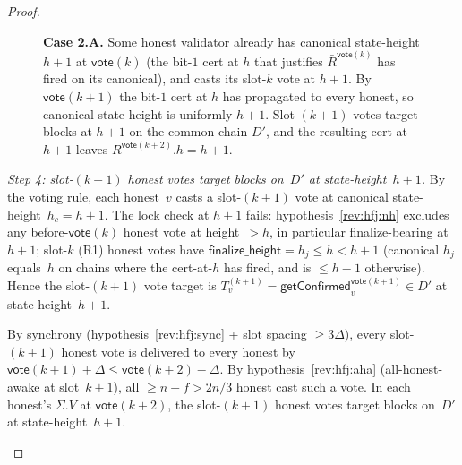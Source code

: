 \ifx\litemode\undefined\documentclass{article}\fi
\newcommand{\finalizeHeight}{\mathsf{finalize\_height}}
\newcommand{\vote}{\mathsf{vote}}
\newcommand{\comm}[1]{\bar{#1}}
\newcommand{\getConfirmed}{\textsf{getConfirmed}\xspace}
\theoremstyle{plain}
\theoremstyle{definition}
\theoremstyle{remark}
\newcommand{\AHA}{all-honest-awake\xspace}
\begin{document}
\begin{proof}
\begin{description}
\begin{description}
\begin{figure}[H]
\caption{\label{rev:fig:hfj-case2a}\textbf{Case 2.A.} Some honest validator already has canonical state-height $h+1$ at $\vote(k)$ (the bit-$1$ cert at $h$ that justifies $\comm{R}^{\vote(k)}$ has fired on its canonical), and casts its slot-$k$ vote at $h+1$. By $\vote(k+1)$ the bit-$1$ cert at $h$ has propagated to every honest, so canonical state-height is uniformly $h+1$. Slot-$(k+1)$ votes target blocks at $h+1$ on the common chain $D'$, and the resulting cert at $h+1$ leaves $R^{\vote(k+2)}.h = h+1$.}
\end{figure}

\emph{Step 4: slot-$(k+1)$ honest votes target blocks on~$D'$ at state-height~$h+1$.}
By the voting rule, each honest~$v$ casts a slot-$(k+1)$ vote at canonical state-height~$h_c = h+1$. The lock check at $h+1$ fails: hypothesis~\ref{rev:hfj:nh} excludes any before-$\vote(k)$ honest vote at height~$>h$, in particular finalize-bearing at $h+1$; slot-$k$ (R1) honest votes have $\finalizeHeight = h_j \leq h < h+1$ (canonical $h_j$ equals~$h$ on chains where the cert-at-$h$ has fired, and is $\leq h-1$ otherwise). Hence the slot-$(k+1)$ vote target is $T_v^{(k+1)} = \getConfirmed_v^{\vote(k+1)} \in D'$ at state-height~$h+1$.

By synchrony (hypothesis~\ref{rev:hfj:sync} + slot spacing $\geq 3\Delta$), every slot-$(k+1)$ honest vote is delivered to every honest by $\vote(k+1) + \Delta \leq \vote(k+2) - \Delta$. By hypothesis~\ref{rev:hfj:aha} (\AHA at slot~$k+1$), all $\geq n - f > 2n/3$ honest cast such a vote. In each honest's $\Sigma.V$ at $\vote(k+2)$, the slot-$(k+1)$ honest votes target blocks on~$D'$ at state-height~$h+1$.


\end{description}
\end{description}
\end{proof}
\end{document}
